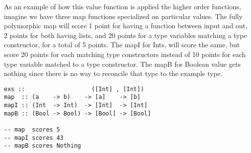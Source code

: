 As an example of how this value function is applied the higher order functions, imagine we have three map functions specialized on particular values. 
The fully polymorphic map will score 1 point for having a function between input and out, 2 points for both having lists, and 20 points for a type variables matching a type constructor, for a total of 5 points. The mapI for Ints, will score the same, but score 20 points for each matching type constructors instead of 10 points for each type variable matched to a type constructor. The mapB for Boolean value gets nothing since there is no way to reconcile that type to the example type.

\begin{lstlisting}[caption=Ranking higher order function,label=horank]
exs ::                   ([Int] , [Int])
map  :: (a    -> b)    -> [a]    -> [b]
mapI :: (Int  -> Int)  -> [Int]  -> [Int]
mapB :: (Bool -> Bool) -> [Bool] -> [Bool]

-- map  scores 5
-- mapI scores 43
-- mapB scores Nothing
\end{lstlisting}
